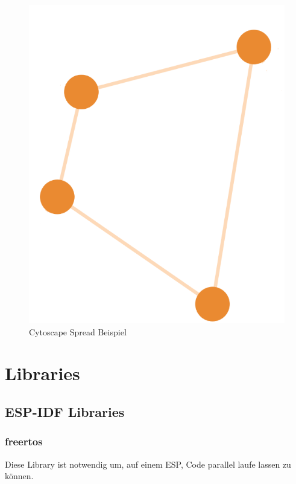 \begin{figure}[H] 
    \begin{center}
        \includegraphics[scale=0.7]{images/cytoscape-spread-example.png}
        \caption{Cytoscape Spread Beispiel \cite{cytoscape_spread}}
        \label{abb:cytoscape-spread-example}
    \end{center}    
\end{figure}

\section{Libraries}\label{sec:libraries}

\subsection{ESP-IDF Libraries}\label{sec:esp-idf-libraries}

\subsubsection{freertos}\label{sec:esp-idf-libraries-freertos}
Diese Library ist notwendig um, auf einem ESP, Code parallel laufe lassen zu können.

